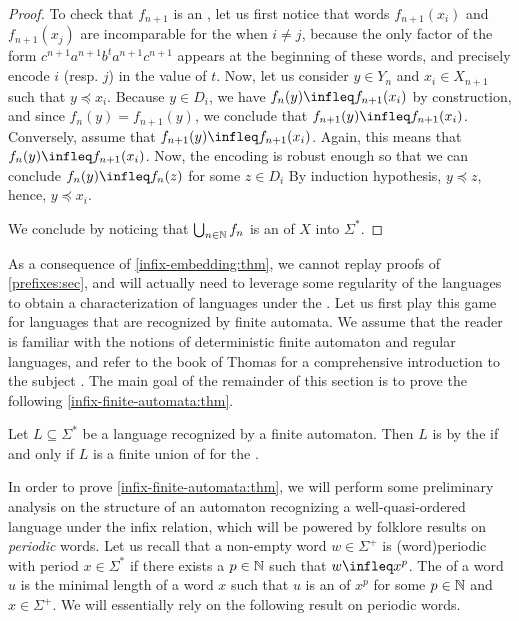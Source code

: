 \begin{proof}
    To check that $f_{n+1}$ is an , let us first notice that
    words $f_{n+1}(x_i)$ and $f_{n+1}(x_j)$ are incomparable for the  when $i \neq j$, because the only factor of the form $c^{n+1}
    a^{n+1} b^t a^{n+1} c^{n+1}$ appears at the beginning of these words, and
    precisely encode $i$ (resp. $j$) in the value of $t$. Now, let us consider
    $y \in Y_n$ and $x_i \in X_{n+1}$ such that $y \preceq x_i$. Because $y \in
    D_i$, we have $f_n(y) \infleq f_{n+1}(x_i)$ by construction, and since
    $f_n(y) = f_{n+1}(y)$, we conclude that $f_{n+1}(y) \infleq f_{n+1}(x_i)$.
    Conversely, assume that $f_{n+1}(y) \infleq f_{n+1}(x_i)$. Again, this
    means that $f_n(y) \infleq f_{n+1}(x_i)$. Now, the encoding is robust
    enough so that we can conclude $f_{n}(y) \infleq f_{n}(z)$ for some $z \in
    D_i$ By induction hypothesis, $y \preceq z$, hence, $y \preceq x_i$.

    We conclude by noticing that $\bigcup_{n \in \mathbb{N}} f_n$ is an 
    of $X$ into $\Sigma^*$.
\end{proof}

As a consequence of \cref{infix-embedding:thm}, we cannot replay proofs of
\cref{prefixes:sec}, and will actually need to leverage some regularity of the
languages to obtain a characterization of  languages
under the . Let us first play this game for languages that
are recognized by finite automata. We assume that the reader is familiar with
the notions of deterministic finite automaton and regular languages, and refer
to the book of Thomas for a comprehensive introduction to the subject
\cite{THOM97}. The main goal of the remainder of this section is to prove the
following \cref{infix-finite-automata:thm}.

\begin{theorem}[restate=infix-finite-automata:thm,label=infix-finite-automata:thm]
    Let $L \subseteq \Sigma^*$ be a language recognized by a finite automaton.
    Then $L$ is  by the  if and only if $L$ is
    a finite union of  for the .
\end{theorem}

\AP In order to prove \cref{infix-finite-automata:thm}, we will perform some
preliminary analysis on the structure of an automaton recognizing a
well-quasi-ordered language under the infix relation, which will be powered by
folklore results on \emph{periodic} words. Let us recall that a non-empty word
$w \in \Sigma^+$ is \intro(word){periodic} with period $x \in \Sigma^*$ if
there exists a $p \in \mathbb{N}$ such that $w \infleq x^p$. The  of a word $u$ is the minimal length of a word $x$ such that $u$ is an
 of $x^p$ for some $p \in \mathbb{N}$ and $x \in \Sigma^+$. We will
essentially rely on the following result on periodic words.

